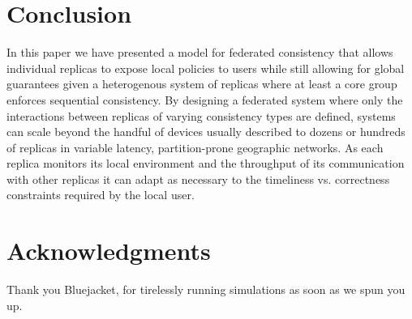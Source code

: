 \documentclass[10pt,conference,compsocconf,letterpaper]{IEEEtran}
\begin{document}
\section{Conclusion}

In this paper we have presented a model for federated consistency that allows individual replicas to expose local policies to users while still allowing for global guarantees given a heterogenous system of replicas where at least a core group enforces sequential consistency. By designing a federated system where only the interactions between replicas of varying consistency types are defined, systems can scale beyond the handful of devices usually described to dozens or hundreds of replicas in variable latency, partition-prone geographic networks. As each replica monitors its local environment and the throughput of its communication with other replicas it can adapt as necessary to the timeliness vs. correctness constraints required by the local user.

\section*{Acknowledgments}

Thank you Bluejacket, for tirelessly running simulations as soon as we spun you up.



\end{document}
